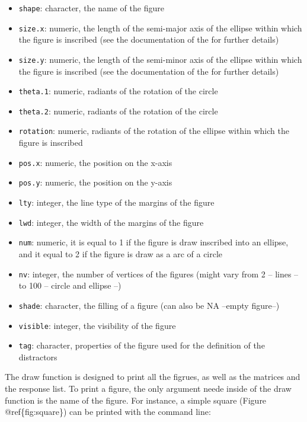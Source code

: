 \begin{itemize}
\tightlist
\item
  \texttt{shape}: character, the name of the figure
\item
  \texttt{size.x}: numeric, the length of the semi-major axis of the ellipse within which the figure is inscribed (see the documentation of the  for further details)
\item
  \texttt{size.y}: numeric, the length of the semi-minor axis of the ellipse within which the figure is inscribed (see the documentation of the  for further details)
\item
  \texttt{theta.1}: numeric, radiants of the rotation of the circle
\item
  \texttt{theta.2}: numeric, radiants of the rotation of the circle
\item
  \texttt{rotation}: numeric, radiants of the rotation of the ellipse within which the figure is inscribed
\item
  \texttt{pos.x}: numeric, the position on the x-axis
\item
  \texttt{pos.y}: numeric, the position on the y-axis
\item
  \texttt{lty}: integer, the line type of the margins of the figure
\item
  \texttt{lwd}: integer, the width of the margins of the figure
\item
  \texttt{num}: numeric, it is equal to 1 if the figure is draw inscribed into an ellipse, and it equal to 2 if the figure is draw as a arc of a circle
\item
  \texttt{nv}: integer, the number of vertices of the figures (might vary from 2 -- lines -- to 100 -- circle and ellipse --)
\item
  \texttt{shade}: character, the filling of a figure (can also be NA --empty figure--)
\item
  \texttt{visible}: integer, the visibility of the figure
\item
  \texttt{tag}: character, properties of the figure used for the definition of the distractors
\end{itemize}

The draw function is designed to print all the figrues, as well as the matrices and the response list.
To print a figure, the only argument neede inside of the draw function is the name of the figure.
For instance, a simple square (Figure @ref\{fig:square\}) can be printed with the command line:

